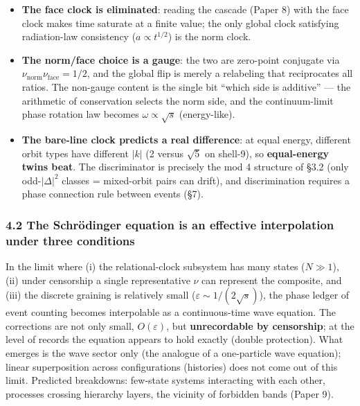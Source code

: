 \documentclass[
]{article}
\providecommand{\tightlist}{%
  \setlength{\itemsep}{0pt}\setlength{\parskip}{0pt}}
\begin{document}
\begin{itemize}
\tightlist
\item
  \textbf{The face clock is eliminated}: reading the cascade (Paper 8)
  with the face clock makes time saturate at a finite value; the only
  global clock satisfying radiation-law consistency
  (\(a\propto t^{1/2}\)) is the norm clock.
\item
  \textbf{The norm/face choice is a gauge}: the two are zero-point
  conjugate via \(\nu_{\mathrm{norm}}\nu_{\mathrm{face}}=1/2\), and the
  global flip is merely a relabeling that reciprocates all ratios. The
  non-gauge content is the single bit ``which side is additive'' --- the
  arithmetic of conservation selects the norm side, and the
  continuum-limit phase rotation law becomes \(\omega\propto\sqrt s\)
  (energy-like).
\item
  \textbf{The bare-line clock predicts a real difference}: at equal
  energy, different orbit types have different \(|k|\) (2 versus
  \(\sqrt5\) on shell-9), so \textbf{equal-energy twins beat}. The
  discriminator is precisely the mod 4 structure of §3.2 (only
  odd-\(|\Delta|^2\) classes = mixed-orbit pairs can drift), and
  discrimination requires a phase connection rule between events (§7).
\end{itemize}

\subsubsection{4.2 The Schrödinger equation is an effective
interpolation under three
conditions}\label{the-schruxf6dinger-equation-is-an-effective-interpolation-under-three-conditions}

In the limit where (i) the relational-clock subsystem has many states
(\(N\gg1\)), (ii) under censorship a single representative \(\nu\) can
represent the composite, and (iii) the discrete graining is relatively
small (\(\varepsilon\sim1/(2\sqrt s)\)), the phase ledger of event
counting becomes interpolable as a continuous-time wave equation. The
corrections are not only small, \(O(\varepsilon)\), but
\textbf{unrecordable by censorship}; at the level of records the
equation appears to hold exactly (double protection). What emerges is
the wave sector only (the analogue of a one-particle wave equation);
linear superposition across configurations (histories) does not come out
of this limit. Predicted breakdowns: few-state systems interacting with
each other, processes crossing hierarchy layers, the vicinity of
forbidden bands (Paper 9).
\end{document}
